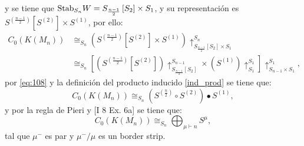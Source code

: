 \documentclass[12pt]{book}
\theoremstyle{definition}
\newcounter{in}
\newcounter{ini}
\begin{document}
y se tiene que $\textup{Stab}_{S_{n}} W = S_{\frac{n-1}{2}} \left [ S_{2} \right ] \times S_{1}$, y su representación es $S^{(\frac{n-1}{2})} \left [ S^{(2)} \right ] \times S^{(1)}$, por ello:
\begin{equation}
\begin{aligned}
C_{0}(K(M_{n})) & \cong_{S_{n}} (S^{(\frac{n-1}{2})} \left [ S^{(2)} \right ] \times S^{(1)})\uparrow_{S_{\frac{n-1}{2}} \left [ S_{2} \right ] \times S_{1}}^{S_{n}} \\
& \cong_{S_{n}} \left [ (S^{(\frac{n-1}{2})} \left [ S^{(2)} \right ])\uparrow_{S_{\frac{n-1}{2}} \left [ S_{2} \right ]}^{S_{n-1}} \times (S^{(1)})\uparrow_{S_{1}}^{S_{1}} \right ] \uparrow_{S_{n-1} \times S_{1}}^{S_{1}},
\end{aligned}
\end{equation} 
por \ref{eq:108} y la definición del producto inducido \ref{ind_prod} se tiene que:
\begin{equation}
C_{0}(K(M_{n})) \cong_{S_{n}} (S^{(\frac{n}{2})} \circ S^{(2)} ) \bullet S^{(1)},
\end{equation} 
y por la regla de Pieri \cite{wachs2006poset} y \cite{macdonald1998symmetric} [I 8 Ex. 6a] se tiene que:
\begin{equation}
  \label{eq:112}
   C_{0}(K(M_n)) \cong_{S_{n}} \bigoplus_{\mu \vdash n} S^{\mu},
\end{equation}
tal que $\mu^{-}$ es par y $\mu^{-} / \mu$ es un border strip.
\end{document}
